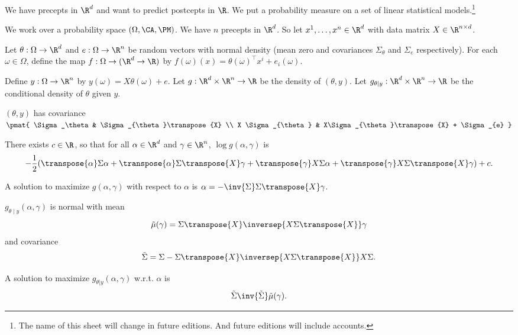 

We have precepts in $\R^d$ and want to predict postcepts in $\R$.
We put a probability measure on a set of linear statistical models.\footnote{The name of this sheet will change in future editions. And future editions will include accounts.}


We work over a probability space $(\Omega, \CA, \PM)$.
We have $n$ precepts in $\R^d$.
So let $x^1, \dots, x^n \in \R^d$ with data matrix $X \in \R^{n \times d}$.

Let $\theta: \Omega \to \R^d$ and $e: \Omega \to \R^n$ be random vectors with normal density (mean zero and covariances $\Sigma_{\theta}$ and $\Sigma_{e}$ respectively).
For each $\omega \in \Omega$, define the map $f: \Omega \to (\R^d \to \R)$ by $f(\omega)(x) = \theta(\omega)^\top x^i + e_i(\omega)$.

Define $y: \Omega \to \R^n$ by
$y(\omega) = X\theta(\omega) + e$.
Let $g: \R^{d} \times \R^{n} \to \R$ be the density of $(\theta, y)$.
Let $g_{\theta \mid y}: \R^d \times \R^n \to \R$ be the conditional density of $\theta$ given $y$.

\begin{proposition}
  $(\theta, y)$ has covariance
  $\pmat{
    \Sigma_\theta & \Sigma_{\theta}\transpose{X} \\
      X \Sigma_{\theta} & X\Sigma_{\theta}\transpose{X} + \Sigma_{e}
  }$
\end{proposition}

\begin{proposition}
  There exists $c \in \R$, so that for all $\alpha \in \R^d$ and $\gamma \in \R^n$, $\log g(\alpha,\gamma)$ is
  \[
    -\frac{1}{2}(\transpose{\alpha}\Sigma\alpha + \transpose{\alpha}\Sigma\transpose{X}\gamma + \transpose{\gamma}X\Sigma\alpha + \transpose{\gamma}X\Sigma \transpose{X}\gamma) + c.
  \]
\end{proposition}
\begin{proposition}
  A solution to maximize $g(\alpha, \gamma)$ with respect to $\alpha$ is $\alpha = -\inv{\Sigma}\Sigma\transpose{X}\gamma$.
\end{proposition}
\begin{proposition}
  $g_{\theta \mid y}(\alpha, \gamma)$ is normal with mean
  \[
    \tilde{\mu}(\gamma) = \Sigma \transpose{X}\inversep{X\Sigma\transpose{X}}\gamma
  \] and covariance \[\tilde{\Sigma} = \Sigma - \Sigma\transpose{X}\inversep{X\Sigma\transpose{X}}X\Sigma.\]%
\end{proposition}
\begin{proposition}
  A solution to maximize $g_{\theta | y}(\alpha, \gamma)$ w.r.t. $\alpha$ is
  \[
    \tilde{\Sigma}\inv{\tilde{\Sigma}}\tilde{\mu}(\gamma).
  \]
\end{proposition}


